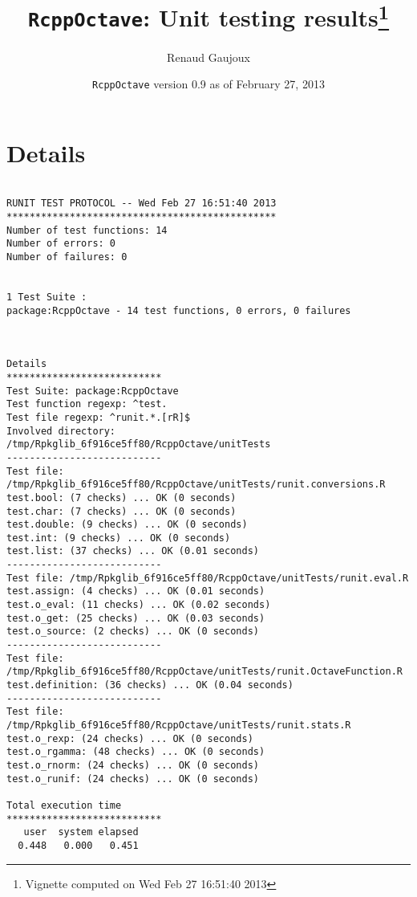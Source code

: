 \documentclass[10pt]{article}
\author{Renaud Gaujoux}
\title{\texttt{RcppOctave}: Unit testing results\footnote{Vignette computed  on Wed Feb 27 16:51:40 2013}}
\date{\texttt{RcppOctave} version 0.9 as of February 27, 2013}
\begin{document}
\maketitle

\section{Details}
\begin{verbatim}

RUNIT TEST PROTOCOL -- Wed Feb 27 16:51:40 2013 
*********************************************** 
Number of test functions: 14 
Number of errors: 0 
Number of failures: 0 

 
1 Test Suite : 
package:RcppOctave - 14 test functions, 0 errors, 0 failures



Details 
*************************** 
Test Suite: package:RcppOctave 
Test function regexp: ^test. 
Test file regexp: ^runit.*.[rR]$ 
Involved directory: 
/tmp/Rpkglib_6f916ce5ff80/RcppOctave/unitTests 
--------------------------- 
Test file: /tmp/Rpkglib_6f916ce5ff80/RcppOctave/unitTests/runit.conversions.R 
test.bool: (7 checks) ... OK (0 seconds)
test.char: (7 checks) ... OK (0 seconds)
test.double: (9 checks) ... OK (0 seconds)
test.int: (9 checks) ... OK (0 seconds)
test.list: (37 checks) ... OK (0.01 seconds)
--------------------------- 
Test file: /tmp/Rpkglib_6f916ce5ff80/RcppOctave/unitTests/runit.eval.R 
test.assign: (4 checks) ... OK (0.01 seconds)
test.o_eval: (11 checks) ... OK (0.02 seconds)
test.o_get: (25 checks) ... OK (0.03 seconds)
test.o_source: (2 checks) ... OK (0 seconds)
--------------------------- 
Test file: /tmp/Rpkglib_6f916ce5ff80/RcppOctave/unitTests/runit.OctaveFunction.R 
test.definition: (36 checks) ... OK (0.04 seconds)
--------------------------- 
Test file: /tmp/Rpkglib_6f916ce5ff80/RcppOctave/unitTests/runit.stats.R 
test.o_rexp: (24 checks) ... OK (0 seconds)
test.o_rgamma: (48 checks) ... OK (0 seconds)
test.o_rnorm: (24 checks) ... OK (0 seconds)
test.o_runif: (24 checks) ... OK (0 seconds)

Total execution time
***************************
   user  system elapsed 
  0.448   0.000   0.451 

\end{verbatim}
\end{document}
